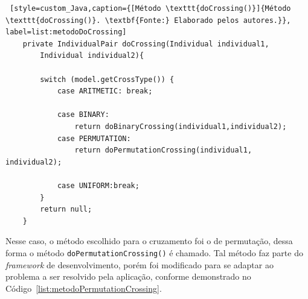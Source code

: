 \begin{lstlisting} [style=custom_Java,caption={[Método \texttt{doCrossing()}]{Método \texttt{doCrossing()}. \textbf{Fonte:} Elaborado pelos autores.}}, label=list:metodoDoCrossing] 
	private IndividualPair doCrossing(Individual individual1, 
		Individual individual2){
		
		switch (model.getCrossType()) {
			case ARITMETIC: break;
			
			case BINARY: 
				return doBinaryCrossing(individual1,individual2);
			case PERMUTATION: 
				return doPermutationCrossing(individual1, individual2);
		
			case UNIFORM:break;
		}
		return null;
	}

\end{lstlisting}


\par Nesse caso, o método escolhido para o cruzamento foi o de permutação, dessa forma o método \texttt{doPermutationCrossing()} é chamado.
Tal método faz parte do \textit{framework} de desenvolvimento, porém foi modificado para se adaptar ao problema a ser resolvido pela 
aplicação, conforme demonstrado no Código~\ref{list:metodoPermutationCrossing}.


